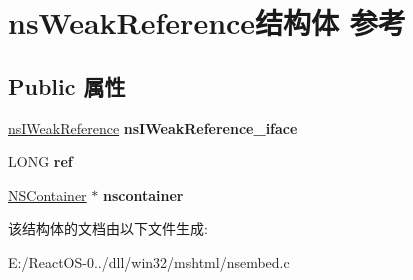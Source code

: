 \hypertarget{structns_weak_reference}{}\section{ns\+Weak\+Reference结构体 参考}
\label{structns_weak_reference}
\subsection*{Public 属性}
\begin{DoxyCompactItemize}
\item 
\mbox{\label{structns_weak_reference_ae5465ca46b140561498f0214e1d15494}} 
\hyperlink{interfacens_i_weak_reference}{ns\+I\+Weak\+Reference} {\bfseries ns\+I\+Weak\+Reference\+\_\+iface}
\item 
\mbox{\label{structns_weak_reference_a1bef52bd5809edc5eed4b0407f8654fb}} 
L\+O\+NG {\bfseries ref}
\item 
\mbox{\label{structns_weak_reference_a58fae0c13fed900853bc7ae831e9fae7}} 
\hyperlink{struct_n_s_container}{N\+S\+Container} $\ast$ {\bfseries nscontainer}
\end{DoxyCompactItemize}


该结构体的文档由以下文件生成\+:\begin{DoxyCompactItemize}
\item 
E\+:/\+React\+O\+S-\/0../dll/win32/mshtml/nsembed.\+c\end{DoxyCompactItemize}
